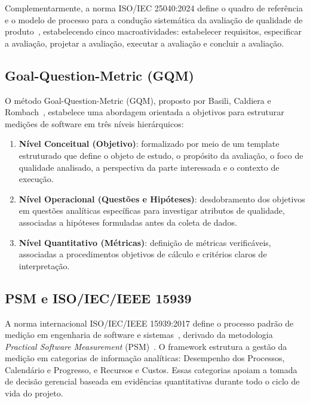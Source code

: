 \documentclass[journal]{IEEEtran}
\begin{document}
Complementarmente, a norma ISO/IEC 25040:2024 define o quadro de referência e o modelo de processo para a condução sistemática da avaliação de qualidade de produto~\cite{iso25040}, estabelecendo cinco macroatividades: estabelecer requisitos, especificar a avaliação, projetar a avaliação, executar a avaliação e concluir a avaliação.

\subsection{Goal-Question-Metric (GQM)}
\label{sec:gqm}

O método Goal-Question-Metric (GQM), proposto por Basili, Caldiera e Rombach~\cite{basili1994gqm}, estabelece uma abordagem orientada a objetivos para estruturar medições de software em três níveis hierárquicos:

\begin{enumerate}
    \item \textbf{Nível Conceitual (Objetivo)}: formalizado por meio de um template estruturado que define o objeto de estudo, o propósito da avaliação, o foco de qualidade analisado, a perspectiva da parte interessada e o contexto de execução.
    \item \textbf{Nível Operacional (Questões e Hipóteses)}: desdobramento dos objetivos em questões analíticas específicas para investigar atributos de qualidade, associadas a hipóteses formuladas antes da coleta de dados.
    \item \textbf{Nível Quantitativo (Métricas)}: definição de métricas verificáveis, associadas a procedimentos objetivos de cálculo e critérios claros de interpretação.
\end{enumerate}

\subsection{PSM e ISO/IEC/IEEE 15939}
\label{sec:psm}

A norma internacional ISO/IEC/IEEE 15939:2017 define o processo padrão de medição em engenharia de software e sistemas~\cite{iso15939}, derivado da metodologia \textit{Practical Software Measurement} (PSM)~\cite{mcgarry2002psm}. O framework estrutura a gestão da medição em categorias de informação analíticas: Desempenho dos Processos, Calendário e Progresso, e Recursos e Custos. Essas categorias apoiam a tomada de decisão gerencial baseada em evidências quantitativas durante todo o ciclo de vida do projeto.
\end{document}
